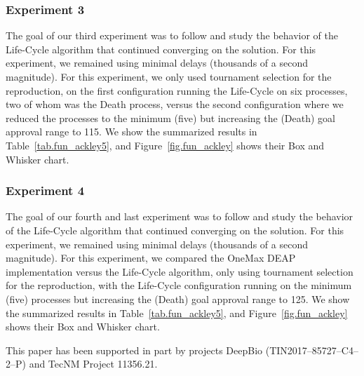 \documentclass[graybox]{svmult}
\begin{document}
\subsubsection{Experiment 3} The goal of our third experiment was to follow and
study the behavior of the Life-Cycle algorithm that continued converging on the
solution. For this experiment, we remained using minimal delays (thousands of a
second magnitude). For this experiment, we only used tournament selection for
the reproduction, on the first configuration running the Life-Cycle on six
processes, two of whom was the Death process, versus the second configuration
where we reduced the processes to the minimum (five) but increasing the (Death)
goal approval range to 115. We show the summarized results in
Table~\ref{tab.fun_ackley5}, and Figure~\ref{fig.fun_ackley} shows their Box
and Whisker chart.


\subsubsection{Experiment 4} The goal of our fourth and last experiment was to
follow and study the behavior of the Life-Cycle algorithm that continued
converging on the solution. For this experiment, we remained using minimal
delays (thousands of a second magnitude). For this experiment, we compared the
OneMax DEAP implementation versus the Life-Cycle algorithm, only using
tournament selection for the reproduction, with the Life-Cycle configuration
running on the minimum (five) processes but increasing the (Death) goal
approval range to 125. We show the summarized results in
Table~\ref{tab.fun_ackley5}, and Figure~\ref{fig.fun_ackley} shows their Box
and Whisker chart.


\begin{acknowledgement}
    This paper has been supported in part by projects DeepBio (TIN2017--85727--C4--2--P) and TecNM Project 11356.21\@.
\end{acknowledgement}

%


\end{document}
